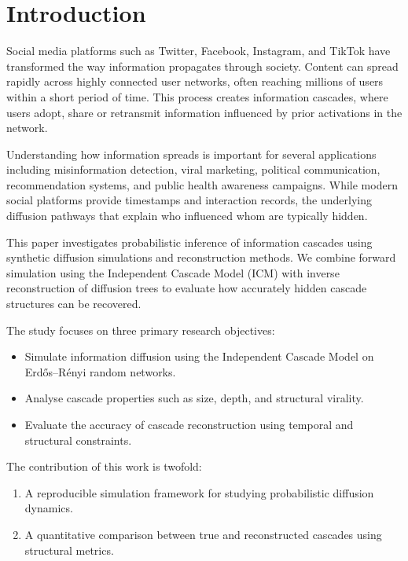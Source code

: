 \documentclass{article}
\begin{document}
\section{Introduction}

Social media platforms such as Twitter, Facebook, Instagram, and TikTok have transformed the way information propagates through society. Content can spread rapidly across highly connected user networks, often reaching millions of users within a short period of time. This process creates information cascades, where users adopt, share or retransmit information influenced by prior activations in the network.

Understanding how information spreads is important for several applications including misinformation detection, viral marketing, political communication, recommendation systems, and public health awareness campaigns. While modern social platforms provide timestamps and interaction records, the underlying diffusion pathways that explain who influenced whom are typically hidden.

This paper investigates probabilistic inference of information cascades using synthetic diffusion simulations and reconstruction methods. We combine forward simulation using the Independent Cascade Model (ICM) with inverse reconstruction of diffusion trees to evaluate how accurately hidden cascade structures can be recovered.

The study focuses on three primary research objectives:

\begin{itemize}
    \item Simulate information diffusion using the Independent Cascade Model on Erd\H{o}s--R\'enyi random networks.
    \item Analyse cascade properties such as size, depth, and structural virality.
    \item Evaluate the accuracy of cascade reconstruction using temporal and structural constraints.
\end{itemize}

The contribution of this work is twofold:

\begin{enumerate}
    \item A reproducible simulation framework for studying probabilistic diffusion dynamics.
    \item A quantitative comparison between true and reconstructed cascades using structural metrics.
\end{enumerate}
\end{document}

